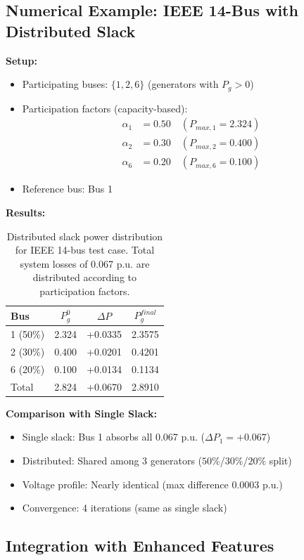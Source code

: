 \documentclass[11pt]{article}
\begin{document}
\subsection{Numerical Example: IEEE 14-Bus with Distributed Slack}

\textbf{Setup:}
\begin{itemize}
    \item Participating buses: $\{1, 2, 6\}$ (generators with $P_g > 0$)
    \item Participation factors (capacity-based):
    \begin{align*}
    \alpha_1 &= 0.50 \quad (P_{max,1} = 2.324) \\
    \alpha_2 &= 0.30 \quad (P_{max,2} = 0.400) \\
    \alpha_6 &= 0.20 \quad (P_{max,6} = 0.100)
    \end{align*}
    \item Reference bus: Bus 1
\end{itemize}

\textbf{Results:}
\begin{table}[h]
\centering
\begin{tabular}{l|c|c|c}
\hline
Bus & $P_g^0$ & $\Delta P$ & $P_g^{final}$ \\
\hline
1 (50\%) & 2.324 & +0.0335 & 2.3575 \\
2 (30\%) & 0.400 & +0.0201 & 0.4201 \\
6 (20\%) & 0.100 & +0.0134 & 0.1134 \\
\hline
Total & 2.824 & +0.0670 & 2.8910 \\
\hline
\end{tabular}
\caption{Distributed slack power distribution for IEEE 14-bus test case. Total system losses of 0.067 p.u. are distributed according to participation factors.}
\end{table}

\textbf{Comparison with Single Slack:}
\begin{itemize}
    \item Single slack: Bus 1 absorbs all 0.067 p.u. ($\Delta P_1 = +0.067$)
    \item Distributed: Shared among 3 generators ($50\%$/$30\%$/$20\%$ split)
    \item Voltage profile: Nearly identical (max difference 0.0003 p.u.)
    \item Convergence: 4 iterations (same as single slack)
\end{itemize}

\subsection{Integration with Enhanced Features}
\end{document}
